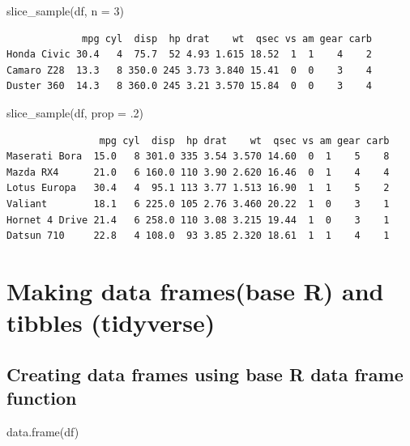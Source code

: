 \documentclass[
]{article}
\newenvironment{Shaded}{\begin{snugshade}}{\end{snugshade}}
\newcommand{\AttributeTok}[1]{\textcolor[rgb]{0.77,0.63,0.00}{#1}}
\newcommand{\DecValTok}[1]{\textcolor[rgb]{0.00,0.00,0.81}{#1}}
\newcommand{\FunctionTok}[1]{\textcolor[rgb]{0.00,0.00,0.00}{#1}}
\newcommand{\NormalTok}[1]{#1}
\begin{document}
\begin{Shaded}
\begin{Highlighting}[]
\FunctionTok{slice\_sample}\NormalTok{(df, }\AttributeTok{n =} \DecValTok{3}\NormalTok{)}
\end{Highlighting}
\end{Shaded}

\begin{verbatim}
             mpg cyl  disp  hp drat    wt  qsec vs am gear carb
Honda Civic 30.4   4  75.7  52 4.93 1.615 18.52  1  1    4    2
Camaro Z28  13.3   8 350.0 245 3.73 3.840 15.41  0  0    3    4
Duster 360  14.3   8 360.0 245 3.21 3.570 15.84  0  0    3    4
\end{verbatim}

\begin{Shaded}
\begin{Highlighting}[]
\FunctionTok{slice\_sample}\NormalTok{(df, }\AttributeTok{prop =}\NormalTok{ .}\DecValTok{2}\NormalTok{)}
\end{Highlighting}
\end{Shaded}

\begin{verbatim}
                mpg cyl  disp  hp drat    wt  qsec vs am gear carb
Maserati Bora  15.0   8 301.0 335 3.54 3.570 14.60  0  1    5    8
Mazda RX4      21.0   6 160.0 110 3.90 2.620 16.46  0  1    4    4
Lotus Europa   30.4   4  95.1 113 3.77 1.513 16.90  1  1    5    2
Valiant        18.1   6 225.0 105 2.76 3.460 20.22  1  0    3    1
Hornet 4 Drive 21.4   6 258.0 110 3.08 3.215 19.44  1  0    3    1
Datsun 710     22.8   4 108.0  93 3.85 2.320 18.61  1  1    4    1
\end{verbatim}

\hypertarget{making-data-framesbase-r-and-tibbles-tidyverse}{%
\section{Making data frames(base R) and tibbles
(tidyverse)}\label{making-data-framesbase-r-and-tibbles-tidyverse}}

\hypertarget{creating-data-frames-using-base-r-data-frame-function}{%
\subsection{Creating data frames using base R data frame
function}\label{creating-data-frames-using-base-r-data-frame-function}}

\begin{Shaded}
\begin{Highlighting}[]
\FunctionTok{data.frame}\NormalTok{(df)}
\end{Highlighting}
\end{Shaded}
\end{document}
